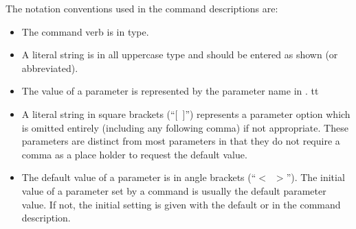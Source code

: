 \ifx\PROGRAM\ALGEBRA \newpage \fi %
The notation conventions used in the command descriptions are:
\setlength{\itemsep}{\medskipamount} \begin{itemize}
\item
The command verb is in  type.
\item
A literal string is in all uppercase  type and should be
entered as shown (or abbreviated).
\item
The value of a parameter is represented by the parameter name in
.
\newcommand{\okoptpar}{f}
\ifx\PROGRAM\BLOT \renewcommand{\okoptpar}{t} \fi
\ifx\PROGRAM\ALGEBRA \renewcommand{\okoptpar}{t} \fi
\ifx\PROGRAM\GROPE \renewcommand{\okoptpar}{t} \fi
\if\okoptpar t
\item
A literal string in square brackets (``[~]'') represents a parameter
option which is omitted entirely (including any following comma) if not
appropriate. These parameters are distinct from most parameters in that
they do not require a comma as a place holder to request the default
value.
\fi
\item
The default value of a parameter is in angle brackets (``$<$~$>$''). The
initial value of a parameter set by a command is usually the default
parameter value. If not, the initial setting is given with the default
or in the command description.
\end{itemize}
